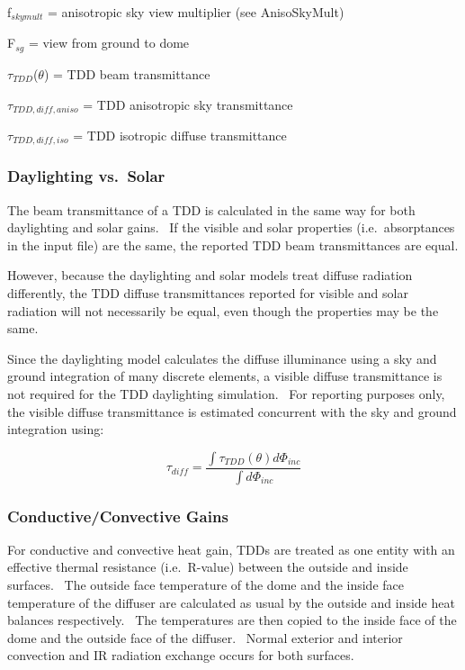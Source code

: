 f\(_{skymult}\) = anisotropic sky view multiplier (see AnisoSkyMult)

F\(_{sg}\) = view from ground to dome

\(\tau_{TDD}\)(\(\theta\)) = TDD beam transmittance

\(\tau_{TDD,diff,aniso}\) = TDD anisotropic sky transmittance

\(\tau_{TDD,diff,iso}\) = TDD isotropic diffuse transmittance

\subsubsection{Daylighting vs.~Solar}\label{daylighting-vs.solar}

The beam transmittance of a TDD is calculated in the same way for both daylighting and solar gains.~ If the visible and solar properties (i.e.~absorptances in the input file) are the same, the reported TDD beam transmittances are equal.

However, because the daylighting and solar models treat diffuse radiation differently, the TDD diffuse transmittances reported for visible and solar radiation will not necessarily be equal, even though the properties may be the same.

Since the daylighting model calculates the diffuse illuminance using a sky and ground integration of many discrete elements, a visible diffuse transmittance is not required for the TDD daylighting simulation.~ For reporting purposes only, the visible diffuse transmittance is estimated concurrent with the sky and ground integration using:

\begin{equation}
{\tau_{diff}} = \frac{{\int {{\tau_{TDD}}(\theta )d{\Phi_{inc}}} }}{{\int {d{\Phi_{inc}}} }}
\end{equation}

\subsubsection{Conductive/Convective Gains}\label{conductiveconvective-gains}

For conductive and convective heat gain, TDDs are treated as one entity with an effective thermal resistance (i.e.~R-value) between the outside and inside surfaces.~ The outside face temperature of the dome and the inside face temperature of the diffuser are calculated as usual by the outside and inside heat balances respectively.~ The temperatures are then copied to the inside face of the dome and the outside face of the diffuser.~ Normal exterior and interior convection and IR radiation exchange occurs for both surfaces.

